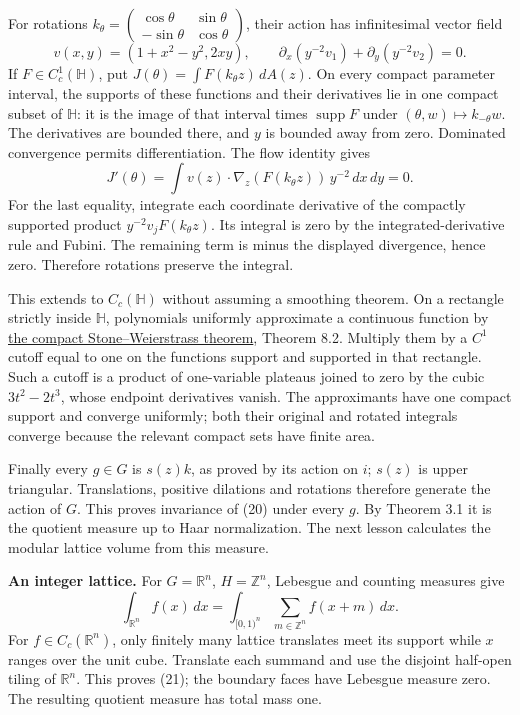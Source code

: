 \documentclass[
  english,
  11pt,
  a4paper,
]{article}
\begin{document}
For rotations
\(k_\theta=\begin{pmatrix}\cos\theta&\sin\theta\\ -\sin\theta&\cos\theta\end{pmatrix}\),
their action has infinitesimal vector field
\[v(x,y)=(1+x^2-y^2,2xy),\qquad
\partial_x(y^{-2}v_1)+\partial_y(y^{-2}v_2)=0.\] If
\(F\in C_c^1(\mathbb H)\), put \(J(\theta)=\int F(k_\theta z)\,dA(z)\).
On every compact parameter interval, the supports of these functions and
their derivatives lie in one compact subset of \(\mathbb H\): it is the
image of that interval times \(\operatorname{supp}F\) under
\((\theta,w)\mapsto k_{-\theta}w\). The derivatives are bounded there,
and \(y\) is bounded away from zero. Dominated convergence permits
differentiation. The flow identity gives
\[J'(\theta)=\int v(z)\cdot\nabla_z(F(k_\theta z))\,y^{-2}\,dx\,dy=0.\]
For the last equality, integrate each coordinate derivative of the
compactly supported product \(y^{-2}v_jF(k_\theta z)\). Its integral is
zero by the integrated-derivative rule and Fubini. The remaining term is
minus the displayed divergence, hence zero. Therefore rotations preserve
the integral.

This extends to \(C_c(\mathbb H)\) without assuming a smoothing theorem.
On a rectangle strictly inside \(\mathbb H\), polynomials uniformly
approximate a continuous function by
\hyperref[the-stone-weierstrass-theorem-for-functions-vanishing-at-infinity]{the
compact Stone--Weierstrass theorem}, Theorem 8.2. Multiply them by a
\(C^1\) cutoff equal to one on the function\textquotesingle s support
and supported in that rectangle. Such a cutoff is a product of
one-variable plateaus joined to zero by the cubic \(3t^2-2t^3\), whose
endpoint derivatives vanish. The approximants have one compact support
and converge uniformly; both their original and rotated integrals
converge because the relevant compact sets have finite area.

Finally every \(g\in G\) is \(s(z)k\), as proved by its action on \(i\);
\(s(z)\) is upper triangular. Translations, positive dilations and
rotations therefore generate the action of \(G\). This proves invariance
of (20) under every \(g\). By Theorem 3.1 it is the quotient measure up
to Haar normalization. The next lesson calculates the modular lattice
volume from this measure.

\textbf{An integer lattice.} For \(G=\mathbb R^n\), \(H=\mathbb Z^n\),
Lebesgue and counting measures give \[\int_{\mathbb R^n}f(x)\,dx
=\int_{[0,1)^n}\sum_{m\in\mathbb Z^n}f(x+m)\,dx.
\tag{21}\] For \(f\in C_c(\mathbb R^n)\), only finitely many lattice
translates meet its support while \(x\) ranges over the unit cube.
Translate each summand and use the disjoint half-open tiling of
\(\mathbb R^n\). This proves (21); the boundary faces have Lebesgue
measure zero. The resulting quotient measure has total mass one.
\end{document}
